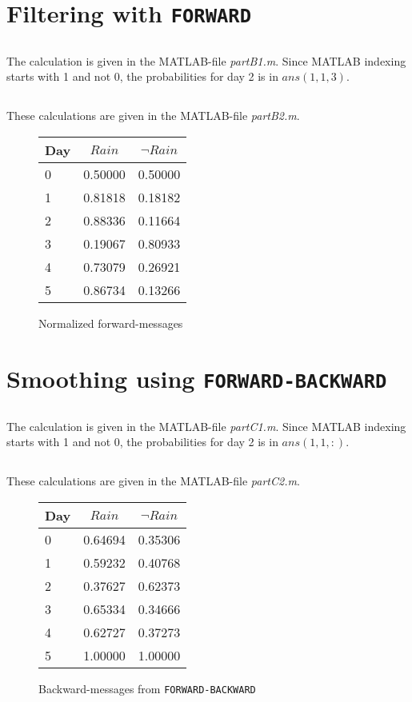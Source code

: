 \documentclass[english]{article}
\begin{document}
\section{Filtering with \texttt{FORWARD}}
\subsection{}
The calculation is given in the MATLAB-file \emph{partB1.m}. Since MATLAB
indexing starts with 1 and not 0, the probabilities for day 2 is in
\(ans(1,1,3)\).

\subsection{}
These calculations are given in the MATLAB-file \emph{partB2.m}.
\begin{figure}[h]
\begin{tabular}{|l||c|c|}
\hline
Day & \(Rain\) & \(\lnot Rain\) \\
\hline
\hline
0 & 0.50000 & 0.50000\\
1 & 0.81818 & 0.18182\\
2 & 0.88336 & 0.11664\\
3 & 0.19067 & 0.80933\\
4 & 0.73079 & 0.26921\\
5 & 0.86734 & 0.13266\\
\hline
\end{tabular}
\caption{Normalized forward-messages}
\end{figure}

\newpage
\section{Smoothing using \texttt{FORWARD-BACKWARD}}
\subsection{}
The calculation is given in the MATLAB-file \emph{partC1.m}. Since MATLAB
indexing starts with 1 and not 0, the probabilities for day 2 is in
\(ans(1,1,:)\).

\subsection{}
These calculations are given in the MATLAB-file \emph{partC2.m}.
\begin{figure}[h]
\begin{tabular}{|l||c|c|}
\hline
Day & \(Rain\) & \(\lnot Rain\) \\
\hline
\hline
0 & 0.64694 & 0.35306\\
1 & 0.59232 & 0.40768\\
2 & 0.37627 & 0.62373\\
3 & 0.65334 & 0.34666\\
4 & 0.62727 & 0.37273\\
5 & 1.00000 & 1.00000\\
\hline
\end{tabular}
\caption{Backward-messages from \texttt{FORWARD-BACKWARD}}
\end{figure}
\end{document}
